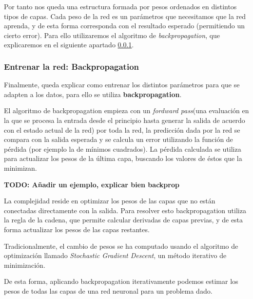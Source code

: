 \documentclass[12,twoside]{TFG-GM}
\theoremstyle{definition}
\theoremstyle{remark}
\begin{document}
Por tanto nos queda una estructura formada por pesos ordenados en distintos tipos de capas. Cada peso de la red es un parámetros que necesitamos que la red aprenda, y de esta forma corresponda con el resultado esperado (permitiendo un cierto error). Para ello utilizaremos el algoritmo de \textit{backpropagation}, que explicaremos en el siguiente apartado \ref{sec:backpropagation}.

\subsubsection{Entrenar la red: Backpropagation}\label{sec:backpropagation}
Finalmente, queda explicar como entrenar los distintos parámetros para que se adapten a los datos, para ello se utiliza \textbf{backpropagation}.

El algoritmo de backpropagation empieza con un \textit{fordward pass}(una evaluación en la que se procesa la entrada desde el principio hasta generar la salida de acuerdo con el estado actual de la red) por toda la red, la predicción dada por la red se compara con la salida esperada 
y se calcula un error utilizando la función de pérdida (por ejemplo la de mínimos cuadrados). La pérdida calculada se utiliza para actualizar los pesos de la última capa, buscando los valores de éstos que la minimizan.

\textbf{TODO: Añadir un ejemplo, explicar bien backprop}

La complejidad reside en optimizar los pesos de las capas que no están conectadas directamente con la salida. Para resolver esto backpropagation utiliza la regla de la cadena, que permite calcular derivadas de capas previas, y de esta forma actualizar los pesos de las capas restantes. 

Tradicionalmente, el cambio de pesos se ha computado usando el algoritmo de optimización llamado \textit{ Stochastic Gradient Descent}, un método iterativo de minimización.

De esta forma, aplicando backpropagation iterativamente podemos estimar los pesos de todas las capas de una red neuronal para un problema dado.




\newpage
\end{document}
